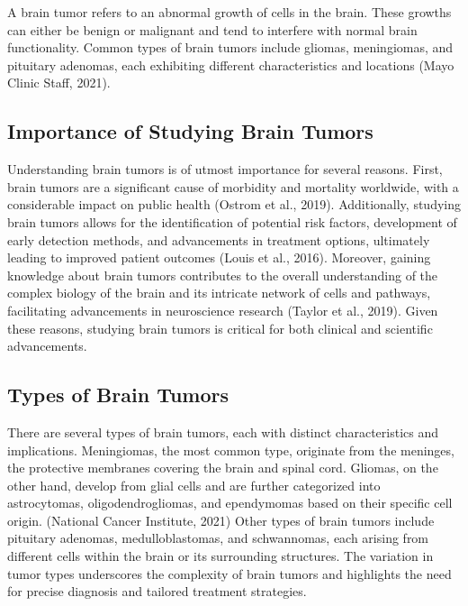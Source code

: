 \documentclass[12pt,oneside]{report}
\begin{document}
A brain tumor refers to an abnormal growth of cells in the brain. These growths can either be benign or malignant and tend to interfere with normal brain functionality. Common types of brain tumors include 
gliomas, meningiomas, and pituitary adenomas, each exhibiting different characteristics and locations 
(Mayo Clinic Staff, 2021).

\subsection{Importance of Studying Brain Tumors}
Understanding brain tumors is of utmost importance for several reasons. First, brain tumors are a 
significant cause of morbidity and mortality worldwide, with a considerable impact on public health 
(Ostrom et al., 2019). Additionally, studying brain tumors allows for the identification of potential risk 
factors, development of early detection methods, and advancements in treatment options, ultimately 
leading to improved patient outcomes (Louis et al., 2016). Moreover, gaining knowledge about brain 
tumors contributes to the overall understanding of the complex biology of the brain and its intricate 
network of cells and pathways, facilitating advancements in neuroscience research (Taylor et al., 2019). 
Given these reasons, studying brain tumors is critical for both clinical and scientific advancements.

\subsection{Types of Brain Tumors}
There are several types of brain tumors, each with distinct characteristics and implications. Meningiomas, 
the most common type, originate from the meninges, the protective membranes covering the brain 
and spinal cord. Gliomas, on the other hand, develop from glial cells and are further categorized into 
astrocytomas, oligodendrogliomas, and ependymomas based on their specific cell origin. (National 
Cancer Institute, 2021) Other types of brain tumors include pituitary adenomas, medulloblastomas, and 
schwannomas, each arising from different cells within the brain or its surrounding structures. The variation 
in tumor types underscores the complexity of brain tumors and highlights the need for precise diagnosis 
and tailored treatment strategies.
\end{document}
